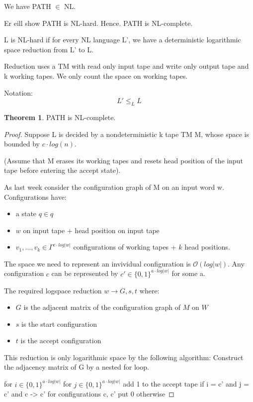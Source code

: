 \documentclass[a4paper,12pt]{article}
\theoremstyle{definition}
\newtheorem{theorem}[counter]{Theorem}
\theoremstyle{remark}
\begin{document}
We have PATH $\in$ NL.

Er eill show PATH is NL-hard. Hence. PATH is NL-complete.

L is NL-hard if for every NL language L', we have a deterministic logarithmic space reduction from L' to L.

Reduction uses a TM with read only input tape and write only output tape and k working tapes. We only count the space on working tapes.

Notation:
\begin{equation*}
    L' \leq_L L
\end{equation*}

\begin{theorem}
    PATH is NL-complete.
\end{theorem}

\begin{proof}
    Suppose L is decided by a nondeterministic k tape TM M, whose space is bounded by $c \cdot log(n)$.

    (Assume that M erases its working tapes and resets head position of the input tape before entering the accept state).

    As last week consider the configuration graph of M on an input word w. Configurations have:
    \begin{itemize}
        \item a state $q \in q$
        \item $w$ on input tape + head position on input tape
        \item $v_1, \dots, v_k \in \Gamma^{c \cdot log |w|}$ configurations of working tapes + $k$ head positions.
    \end{itemize}

    The space we need to represent an invividual configuration is $\mathscr{O}(log |w|)$. Any configuration $c$ can be represented
    by $c' \in \{0, 1\}^{a \cdot log|w|}$ for some a.

    The required logspace reduction $w \to G, s, t$ where:
    \begin{itemize}
        \item $G$ is the adjacent matrix of the configuration graph of $M$ on $W$
        \item $s$ is the start configuration
        \item $t$ is the accept configuration
    \end{itemize}

    This reduction is only logarithmic space by the following algorithm:
    Construct the adjacency matrix of G by a nested for loop.

    for $i \in \{0, 1\}^{a \cdot log |w|}$
        for $j \in \{0, 1\}^{a \cdot log |w|}$
            add 1 to the accept tape if i = c' and j = c' and c -> c' for configurations c, c'
            put 0 otherwise
\end{proof}
\end{document}
